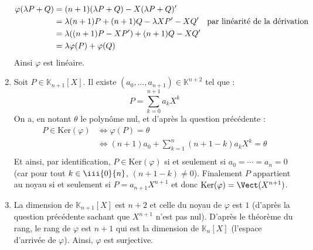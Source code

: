 \documentclass[a4paper,twoside,french,11pt]{VcCours}
\begin{document}
\begin{enumerate}
\begin{align*}
\varphi(\lambda P + Q) & = (n+1)(\lambda P+Q)-X(\lambda P + Q)' \\
& = \lambda (n+1)P + (n+1)Q - \lambda X P' - XQ' \quad \hbox{par linéarité de la dérivation} \\
& = \lambda ((n+1)P-XP') + (n+1)Q-XQ' \\
& = \lambda \varphi(P) + \varphi(Q) 
\end{align*}
Ainsi $\varphi$ est linéaire.
\item Soit $P \in \mathbb{K}_{n+1}[X]$. Il existe $(a_0, \ldots, a_{n+1}) \in \mathbb{K}^{n+2}$ tel que :
$$ P = \sum_{k=0}^{n+1} a_k X^k $$
On a, en notant $\theta$ le polynôme nul, et d'après la question précédente : 
\begin{align*}
P \in \textrm{Ker}(\varphi) & \Longleftrightarrow  \varphi(P) = \theta \\
& \Longleftrightarrow (n+1) a_0 + \sum_{k=1}^n (n+1-k) a_k X^k =\theta  \\
\end{align*}
Et ainsi, par identification, $P \in \textrm{Ker}(\varphi)$ si et seulement si $a_0 = \cdots = a_n = 0$ (car pour tout $k \in  \iii{0}{n}$, $(n+1-k) \neq 0$). Finalement $P$ appartient au noyau si et seulement si $P = a_{n+1} X^{n+1}$ et donc $\textrm{Ker}(\varphi)= \Vect(X^{n+1})$.
\item La dimension de $\mathbb{K}_{n+1}[X]$ est $n+2$ et celle du noyau de $\varphi$ est $1$ (d'après la question précédente sachant que $X^{n+1}$ n'est pas nul). D'après le théorème du rang, le rang de $\varphi$ est $n+1$ qui est la dimension de $\mathbb{K}_n[X]$ (l'espace d'arrivée de $\varphi$). Ainsi, $\varphi$ est surjective.
\end{enumerate}


%
%



\begin{Exercice}{}\end{Exercice}
\end{document}
